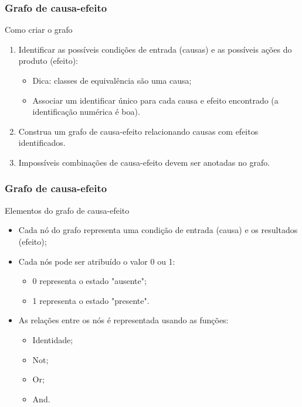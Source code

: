 \begin{frame}
\frametitle{Grafo de causa-efeito}

\begin{block:procedure}{Como criar o grafo}
\begin{enumerate}
	\item Identificar as possíveis condições de entrada (causas) e as possíveis
	ações do produto (efeito):
	\begin{itemize}
		\item Dica: classes de equivalência são uma causa;
		\item Associar um identificar único para cada causa e efeito encontrado (a identificação numérica é boa).
	\end{itemize}

	\item Construa um grafo de causa-efeito relacionando causas com efeitos identificados.

    \item Impossíveis combinações de causa-efeito devem ser anotadas no grafo.
\end{enumerate}
\end{block:procedure}
\end{frame}


\begin{frame}
\frametitle{Grafo de causa-efeito}

\begin{block:fact}{Elementos do grafo de causa-efeito}
\begin{itemize}
	\item Cada nó do grafo representa uma condição de entrada (causa) e
	os resultados (efeito);

	\item Cada nós pode ser atribuído o valor 0 ou 1:
	\begin{itemize}
		\item 0 representa o estado "ausente";
		\item 1 representa o estado "presente".
	\end{itemize}

	\item As relações entre os nós é representada usando as funções:
	\begin{itemize}
		\item Identidade;
		\item Not;
		\item Or;
		\item And.
	\end{itemize}
\end{itemize}
\end{block:fact}
\end{frame}


